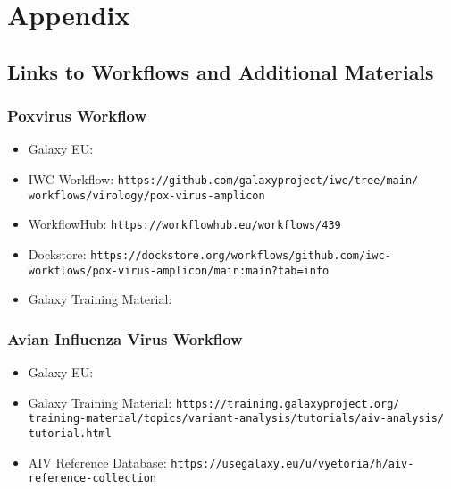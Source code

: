 \chapter*{Appendix}\label{chap:appendix}

% 
\section*{\thesection \quad Links to Workflows and Additional Materials}
% 
\subsection*{\thesubsection \quad Poxvirus Workflow}\label{sec:apx-pox-links}
\begin{itemize}
	\setlength{\itemsep}{-0.4cm}
	\item Galaxy EU: \texttt{\todoit}
	\item IWC Workflow: \texttt{https://github.com/galaxyproject/iwc/tree/main/\\workflows/virology/pox-virus-amplicon}
	\item WorkflowHub: \texttt{https://workflowhub.eu/workflows/439}
	\item Dockstore: \texttt{https://dockstore.org/workflows/github.com/iwc-\\workflows/pox-virus-amplicon/main:main?tab=info}
	\item Galaxy Training Material: \texttt{\todoit}
\end{itemize}

% 
\subsection*{\thesubsection \quad Avian Influenza Virus Workflow}\label{sec:apx-aiv-links}
\begin{itemize}
	\setlength{\itemsep}{-0.4cm}
	\item Galaxy EU: \texttt{\todoit}
	\item Galaxy Training Material: \texttt{https://training.galaxyproject.org/\\training-material/topics/variant-analysis/tutorials/aiv-analysis/\\tutorial.html}
	\item AIV Reference Database: \texttt{https://usegalaxy.eu/u/vyetoria/h/aiv-\\reference-collection}
\end{itemize}

